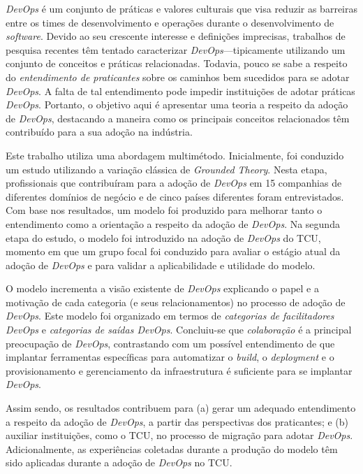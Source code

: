 {\it DevOps} é um conjunto de práticas e valores culturais que visa reduzir as
barreiras entre os times de desenvolvimento e operações durante o
desenvolvimento de {\it software}. Devido ao seu crescente interesse e
definições imprecisas, trabalhos de pesquisa recentes têm tentado caracterizar
{\it DevOps}---tipicamente utilizando um conjunto de conceitos e práticas
relacionadas. Todavia, pouco se sabe a respeito do \emph{entendimento de
praticantes} sobre os caminhos bem sucedidos para se adotar {\it DevOps}. A falta
de tal entendimento pode impedir instituições de adotar práticas {\it DevOps}.
Portanto, o objetivo aqui é apresentar uma teoria a respeito da adoção de
{\it DevOps}, destacando a maneira como os principais conceitos relacionados
têm contribuído para a sua adoção na indústria.

Este trabalho utiliza uma abordagem multimétodo. Inicialmente, foi conduzido um
estudo utilizando a variação clássica de {\it Grounded Theory}. Nesta etapa,
profissionais que contribuíram para a adoção de {\it DevOps} em 15 companhias
de diferentes domínios de negócio e de cinco países diferentes foram
entrevistados. Com base nos resultados, um modelo foi produzido para melhorar
tanto o entendimento como a orientação a respeito da adoção de {\it DevOps}.
Na segunda etapa do estudo, o modelo foi introduzido na adoção de {\it DevOps}
do \acrfull{TCU}, momento em que um grupo focal foi conduzido para avaliar o
estágio atual da adoção de {\it DevOps} e para validar a aplicabilidade e
utilidade do modelo.

O modelo incrementa a visão existente de {\it DevOps} explicando o papel e a
motivação de cada categoria (e seus relacionamentos) no processo de adoção de {\it DevOps}.
Este modelo foi organizado em termos de \emph{categorias de facilitadores DevOps}
e \emph{categorias de saídas DevOps}. Concluiu-se que \emph{colaboração} é a
principal preocupação de {\it DevOps}, contrastando com um possível
entendimento de que implantar ferramentas específicas para automatizar o
{\it build}, o {\it deployment} e o provisionamento e gerenciamento da
infraestrutura é suficiente para se implantar {\it DevOps}.

Assim sendo, os resultados contribuem para (a) gerar um adequado entendimento a
respeito da adoção de {\it DevOps}, a partir das perspectivas dos praticantes;
e (b) auxiliar instituições, como o \acrshort{TCU}, no processo de migração
para adotar {\it DevOps}. Adicionalmente, as experiências coletadas durante a
produção do modelo têm sido aplicadas durante a adoção de {\it DevOps} no
\acrshort{TCU}.

